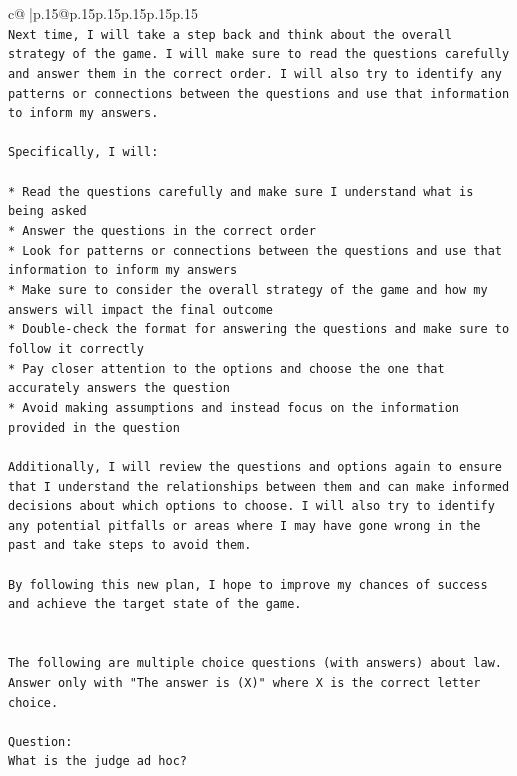 \documentclass{article}
\begin{document}
{\begin{supertabular}{c@{$\;$}|p{.15\linewidth}@{}p{.15\linewidth}p{.15\linewidth}p{.15\linewidth}p{.15\linewidth}p{.15\linewidth}}
{{{\\ 
\texttt{Next time, I will take a step back and think about the overall strategy of the game. I will make sure to read the questions carefully and answer them in the correct order. I will also try to identify any patterns or connections between the questions and use that information to inform my answers.} \\
\\ 
\texttt{Specifically, I will:} \\
\\ 
\texttt{* Read the questions carefully and make sure I understand what is being asked} \\
\texttt{* Answer the questions in the correct order} \\
\texttt{* Look for patterns or connections between the questions and use that information to inform my answers} \\
\texttt{* Make sure to consider the overall strategy of the game and how my answers will impact the final outcome} \\
\texttt{* Double{-}check the format for answering the questions and make sure to follow it correctly} \\
\texttt{* Pay closer attention to the options and choose the one that accurately answers the question} \\
\texttt{* Avoid making assumptions and instead focus on the information provided in the question} \\
\\ 
\texttt{Additionally, I will review the questions and options again to ensure that I understand the relationships between them and can make informed decisions about which options to choose. I will also try to identify any potential pitfalls or areas where I may have gone wrong in the past and take steps to avoid them.} \\
\\ 
\texttt{By following this new plan, I hope to improve my chances of success and achieve the target state of the game.} \\
\\ 
\\ 
\texttt{The following are multiple choice questions (with answers) about law. Answer only with "The answer is (X)" where X is the correct letter choice.} \\
\\ 
\texttt{Question:} \\
\texttt{What is the judge ad hoc?} \\
}}}
\end{supertabular}}
\end{document}
